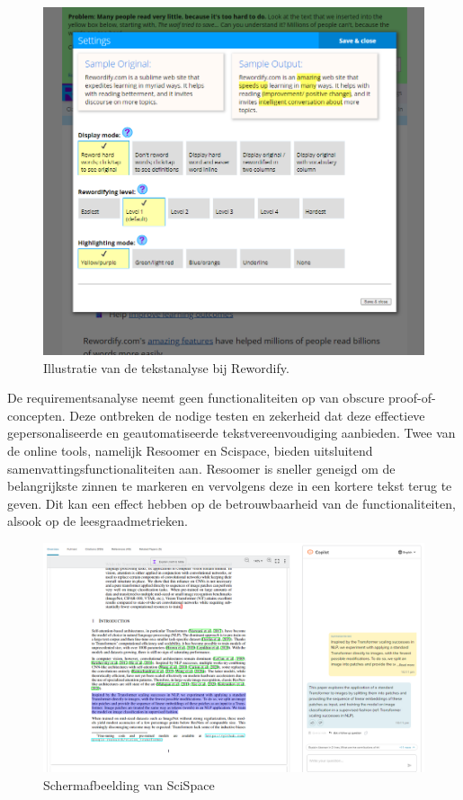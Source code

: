 \begin{figure}[H]
	\includegraphics[width=\linewidth]{img/scholarcy-attempt.png}
	\caption{Illustratie van de tekstanalyse bij Rewordify.}
	\label{img:scholarcy}
\end{figure}

De requirementsanalyse neemt geen functionaliteiten op van obscure proof-of-concepten. Deze ontbreken de nodige testen en zekerheid dat deze effectieve gepersonaliseerde en geautomatiseerde tekstvereenvoudiging aanbieden. Twee van de online tools, namelijk Resoomer en Scispace, bieden uitsluitend samenvattingsfunctionaliteiten aan. Resoomer is sneller geneigd om de belangrijkste zinnen te markeren en vervolgens deze in een kortere tekst terug te geven. Dit kan een effect hebben op de betrouwbaarheid van de functionaliteiten, alsook op de leesgraadmetrieken.

\begin{figure}[H]
	\includegraphics{img/typeset-example.png}
	\caption{Schermafbeelding van SciSpace}
	\label{img:scispace-example}
\end{figure}

